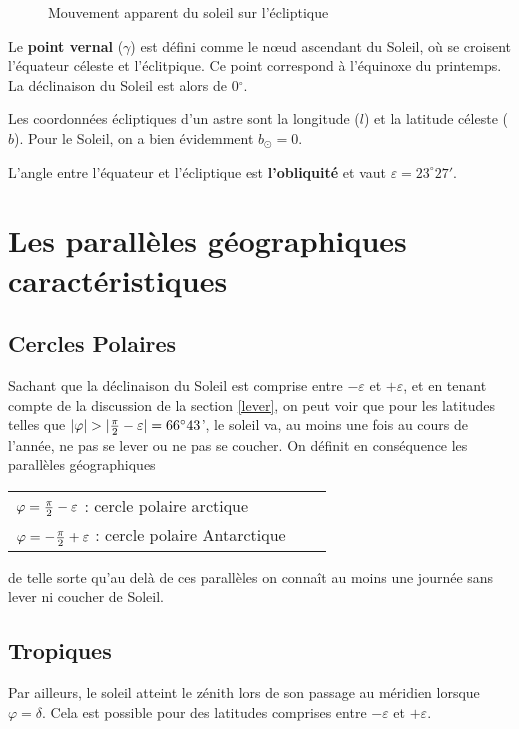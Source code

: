 \documentclass[12pt]{report}
\def\sun{\odot}
\begin{document}
\begin{figure}[ht]
\begin{center}
\end{center}
\caption{Mouvement apparent du soleil sur l'écliptique}
\label{fig:21}
\end{figure}

\bigskip


Le \textbf{point vernal} ($\gamma$) est défini comme le n\oe ud ascendant du Soleil, où se croisent l'équateur céleste et l'éclitpique. Ce point correspond à l'équinoxe du printemps. La déclinaison du Soleil est alors de 0$^\circ$. 

Les coordonnées écliptiques d'un astre sont la longitude ($l$) et la latitude céleste ($b$). Pour le Soleil, on a bien évidemment $b_\sun=0$. 

L'angle entre l'équateur et l'écliptique est \textbf{l'obliquité} et vaut $\varepsilon = 23^\circ 27'$.

\section{Les parallèles géographiques caractéristiques}
\subsection{Cercles Polaires}

Sachant que la déclinaison du Soleil est comprise entre $-\varepsilon$ et $+\varepsilon$, et en tenant compte de la discussion de la section \ref{lever}, on peut voir que pour les latitudes telles que 
 $|\varphi| > |{\pi\over 2}- \varepsilon|=66^\circ 43$', le soleil va, au moins une fois au cours de l'année, ne pas se lever ou ne pas se coucher. On définit en conséquence  les parallèles géographiques   
\begin{tabular}{lll}
$\varphi = {\pi \over 2} - \varepsilon$ : cercle polaire arctique\\
$\varphi = - {\pi \over 2} + \varepsilon$ : cercle polaire Antarctique
\end{tabular}

de  telle sorte qu'au delà de ces parallèles on connaît au moins une journée sans lever ni coucher de Soleil.
\subsection{Tropiques}

Par ailleurs, le soleil atteint le zénith lors de son passage au méridien lorsque $\varphi = \delta$. Cela est possible pour des latitudes comprises entre  $-\varepsilon$ et $+\varepsilon$. 
\end{document}
